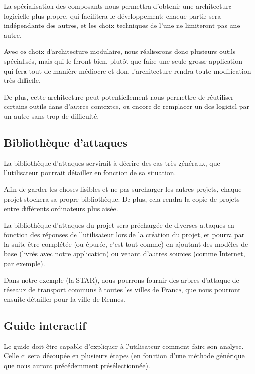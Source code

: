         La spécialisation des composants nous permettra d’obtenir une architecture logicielle plus propre, qui facilitera le développement: chaque partie sera indépendante des autres, et les choix techniques de l'une ne limiteront pas une autre.

        Avec ce choix d'architecture modulaire, nous réaliserons donc plusieurs outils spécialisés, mais qui le feront bien, plutôt que faire une seule grosse application qui fera tout de manière médiocre et dont l'architecture rendra toute modification très difficile.
        
        De plus, cette architecture peut potentiellement nous permettre de réutiliser certains outils dans d'autres contextes, ou encore de remplacer un des logiciel par un autre sans trop de difficulté. 
    
    \subsection{Bibliothèque d'attaques}  
        \label{subsec:biblio_atk}
        La bibliothèque d'attaques servirait à décrire des cas très généraux, que l'utilisateur pourrait détailler en fonction de sa situation. 
        
        Afin de garder les choses lisibles et ne pas surcharger les autres projets, chaque projet stockera sa propre bibliothèque. De plus, cela rendra la copie de projets entre différents ordinateurs plus aisée.
        
        La bibliothèque d'attaques du projet sera préchargée de diverses attaques en fonction des réponses de l'utilisateur lors de la création du projet, et pourra par la suite être complétée (ou épurée, c'est tout comme) en ajoutant des modèles de base (livrés avec notre application) ou venant d'autres sources (comme Internet, par exemple).
        
        Dans notre exemple (la STAR), nous pourrons fournir des arbres d'attaque de réseaux de transport communs à toutes les villes de France, que nous pourront ensuite détailler pour la ville de Rennes.
      
    \subsection{Guide interactif}
        \label{subsec:guide_inter}
        Le guide doit être capable d'expliquer à l'utilisateur comment faire son analyse. Celle ci sera découpée en plusieurs étapes (en fonction d'une méthode générique que nous auront précédemment présélectionnée). %

